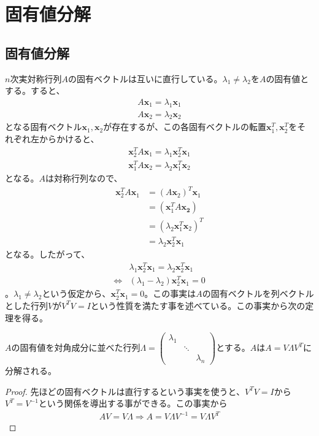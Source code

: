 \section{固有値分解}
\subsection{固有値分解}
$n$次実対称行列$A$の固有ベクトルは互いに直行している。$\lambda_1 \not= \lambda_2$を$A$の固有値とする。すると、
\begin{align*}
  A \mathbf{x}_1 = \lambda_1 \mathbf{x}_1 \\
  A \mathbf{x}_2 = \lambda_2 \mathbf{x}_2
\end{align*}
となる固有ベクトル$\mathbf{x}_1, \mathbf{x}_2$が存在するが、この各固有ベクトルの転置$\mathbf{x}_1^T, \mathbf{x}_2^T$をそれぞれ左からかけると、
\begin{align*}
  \mathbf{x}_2^T A \mathbf{x}_1 = \lambda_1 \mathbf{x}_2^T \mathbf{x}_1 \\
  \mathbf{x}_1^T A \mathbf{x}_2 = \lambda_2 \mathbf{x}_1^T \mathbf{x}_2
\end{align*}
となる。$A$は対称行列なので、
\begin{align*}
  \mathbf{x}_2^T A \mathbf{x}_1 & = (A \mathbf{x}_2)^T \mathbf{x}_1 \\
                                & = (\mathbf{x}_1^T A \mathbf{x_2}) \\
                                & = (\lambda_2 \mathbf{x}_1^T \mathbf{x}_2)^T \\
                                & = \lambda_2 \mathbf{x}_2^T \mathbf{x}_1
\end{align*}
となる。したがって、
\begin{align*}
                  & \lambda_1 \mathbf{x}_2^T \mathbf{x}_1 = \lambda_2 \mathbf{x}_2^T \mathbf{x}_1 \\
  \Leftrightarrow & (\lambda_1 - \lambda_2) \mathbf{x}_2^T \mathbf{x}_1 = 0
\end{align*}
。$\lambda_1 \not= \lambda_2$という仮定から、$\mathbf{x}_2^T \mathbf{x}_1 = 0$。この事実は$A$の固有ベクトルを列ベクトルとした行列$V$が$V^T V = I$という性質を満たす事を述べている。この事実から次の定理を得る。
\begin{theorem*}
  $A$の固有値を対角成分に並べた行列$\Lambda = \displaystyle{\left(\begin{array}{ccc} \lambda_1 & & \\ & \ddots & \\ & & \lambda_n \end{array}\right)}$とする。$A$は$A = V \Lambda V^T$に分解される。
\end{theorem*}
\begin{proof}
  先ほどの固有ベクトルは直行するという事実を使うと、$V^T V = I$から$V^T = V^{-1}$という関係を導出する事ができる。この事実から
  \begin{align*}
    A V = V \Lambda \Rightarrow A = V \Lambda V^{-1} = V \Lambda V^T
  \end{align*}
\end{proof}

